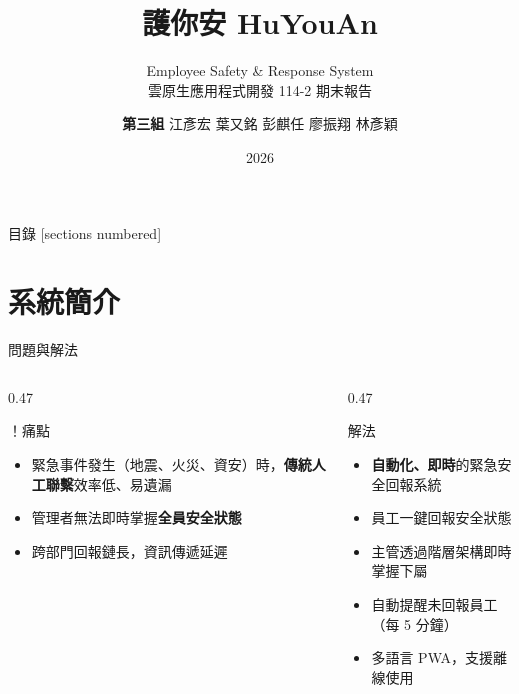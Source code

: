 \documentclass[aspectratio=169,12pt]{beamer}
\title{護你安 HuYouAn}
\subtitle{Employee Safety \& Response System\\雲原生應用程式開發 114-2 期末報告}
\author[第三組]{%
  \textbf{第三組} \quad
  江彥宏 \enspace 葉又銘 \enspace 彭麒任 \enspace 廖振翔 \enspace 林彥穎}
\date{2026}
\institute{}
\newcommand{\cmark}{\ding{51}}
\begin{document}

\maketitle

\begin{frame}{目錄}
  [sections numbered]
  \tableofcontents[hideallsubsections]
\end{frame}

\section{系統簡介}

\begin{frame}{問題與解法}
\begin{columns}[T,onlytextwidth]
\begin{column}{0.47\textwidth}
  \begin{alertblock}{！\enspace 痛點}
    \begin{itemize}\small
      \item 緊急事件發生（地震、火災、資安）時，\textbf{傳統人工聯繫}效率低、易遺漏
      \item 管理者無法即時掌握\textbf{全員安全狀態}
      \item 跨部門回報鏈長，資訊傳遞延遲
    \end{itemize}
  \end{alertblock}
\end{column}
\hfill
\begin{column}{0.47\textwidth}
  \begin{exampleblock}{\cmark\enspace 解法}
    \begin{itemize}\small
      \item \textbf{自動化、即時}的緊急安全回報系統
      \item 員工一鍵回報安全狀態
      \item 主管透過階層架構即時掌握下屬
      \item 自動提醒未回報員工（每 5 分鐘）
      \item 多語言 PWA，支援離線使用
    \end{itemize}
  \end{exampleblock}
\end{column}
\end{columns}
\end{frame}
\end{document}
